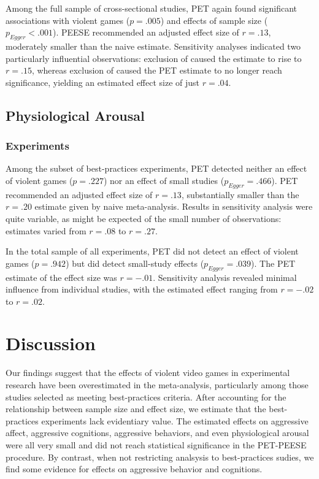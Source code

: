\documentclass[man]{apa6}
\begin{document}
Among the full sample of cross-sectional studies, PET again found significant associations with violent games ($p = .005$) and effects of sample size ($p_{Egger} < .001$). PEESE recommended an adjusted effect size of $r = .13$, moderately smaller than the naive estimate. Sensitivity analyses indicated two particularly influential observations: exclusion of \citet{Santisteban:etal:2007} caused the estimate to rise to $r = .15$, whereas exclusion of \citet{Funk:etal:2003} caused the PET estimate to no longer reach significance, yielding an estimated effect size of just $r = .04$.

\subsection{Physiological Arousal}
\subsubsection{Experiments}
Among the subset of best-practices experiments, PET detected neither an effect of violent games ($p = .227$) nor an effect of small studies ($p_{Egger} = .466$). PET recommended an adjusted effect size of $r = .13$, substantially smaller than the $r = .20$ estimate given by naive meta-analysis. Results in sensitivity analysis were quite variable, as might be expected of the small number of observations: estimates varied from $r = .08$ to $r = .27$.

In the total sample of all experiments, PET did not detect an effect of violent games ($p = .942$) but did detect small-study effects ($p_{Egger} = .039$). The PET estimate of the effect size was $r = -.01$. Sensitivity analysis revealed minimal influence from individual studies, with the estimated effect ranging from $r = -.02$ to $r = .02$.

\section{Discussion}
Our findings suggest that the effects of violent video games in experimental research have been overestimated in the \citet{Anderson:etal:2010} meta-analysis, particularly among those studies selected as meeting best-practices criteria. After accounting for the relationship between sample size and effect size, we estimate that the best-practices experiments lack evidentiary value. The estimated effects on aggressive affect, aggressive cognitions, aggressive behaviors, and even physiological arousal were all very small and did not reach statistical significance in the PET-PEESE procedure. By contrast, when not restricting analsysis to best-practices sudies, we find some evidence for effects on aggressive behavior and cognitions. 
\end{document}
